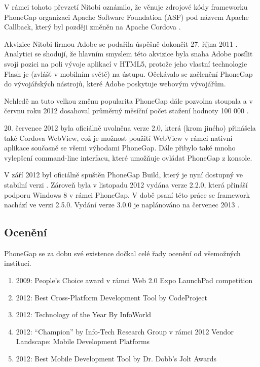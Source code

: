 V rámci tohoto převzetí Nitobi oznámilo, že věnuje zdrojové kódy frameworku PhoneGap organizaci Apache Software Foundation (ASF) pod názvem Apache Callback, který byl později změněn na Apache Cordova \cite{nitobi_adobe2,phonegap_13_released}. 

Akvizice Nitobi firmou Adobe se podařila úspěšně dokončit 27. října 2011 \cite{nitobi_adobe2}. Analytici se shodují, že hlavním smyslem této akvizice byla snaha Adobe posílit svojí pozici na poli vývoje aplikací v HTML5, protože jeho vlastní technologie Flash je (zvlášť v mobilním světě) na ústupu. Očekávalo se začlenění PhoneGap do vývojářských nástrojů, které Adobe poskytuje webovým vývojářům.

Nehledě na tuto velkou změnu popularita PhoneGap dále pozvolna stoupala a v červnu roku 2012 dosahoval průměrný měsíční počet stažení hodnoty 100 000 \cite{phonegap_myths}.

20. července 2012 byla oficiálně uvolněna verze 2.0, která (krom jiného) přinášela také Cordova WebView, což je možnost použití WebView v rámci nativní aplikace současně se všemi výhodami PhoneGap. Dále přibylo také mnoho vylepšení command-line interfacu, které umožňuje ovládat PhoneGap z konsole. \cite{phonegap_2_released} 

V září 2012 byl oficiálně spuštěn PhoneGap Build, který je nyní dostupný ve stabilní verzi \cite{phonegap_build_launched}. Zároveň byla v listopadu 2012 vydána verze 2.2.0, která přináší podporu Windows 8 v rámci PhoneGap. V době psaní této práce se framework nachází ve verzi 2.5.0. Vydání verze 3.0.0 je naplánováno na červenec 2013 \cite{cordova_roadmapprojects}. 

\subsection{Ocenění}
PhoneGap se za dobu své existence dočkal celé řady ocenění od všemožných institucí.

\begin{enumerate}
	\item 2009: People’s Choice award v rámci Web 2.0 Expo LaunchPad competition \cite{phonegap_winning_webexpo}
	\item 2012: Best Cross-Platform Development Tool by CodeProject \cite{phonegap_best_xplatfrom_tool}
	\item 2012: Technology of the Year By InfoWorld \cite{infoworld_technology_of_2012}
	\item 2012: “Champion” by Info-Tech Research Group v rámci 2012 Vendor Landscape: Mobile Development Platforms \cite{phonegap_champion}
	\item 2012: Best Mobile Development Tool by Dr. Dobb's Jolt Awards \cite{phonegap_best_mobile_dev_tool}
\end{enumerate}

